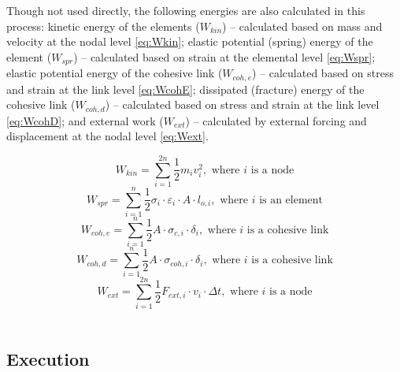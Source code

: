 \documentclass[12pt,a4paper]{article}
\begin{document}
Though not used directly, the following energies are also calculated in this process: kinetic energy of the elements ($W_{kin}$) -- calculated based on mass and velocity at the nodal level \eqref{eq:Wkin}; elastic potential (spring) energy of the element ($W_{spr}$) -- calculated based on strain at the elemental level \eqref{eq:Wspr}; elastic potential energy of the cohesive link ($W_{coh, e}$) -- calculated based on stress and strain at the link level \eqref{eq:WcohE}; dissipated (fracture) energy of the cohesive link ($W_{coh, d}$) -- calculated based on stress and strain at the link level \eqref{eq:WcohD}; and external work ($W_{ext}$) -- calculated by external forcing and displacement at the nodal level \eqref{eq:Wext}.

\begin{equation}
W_{kin} = \sum_{i=1}^{2n} \frac{1}{2} m_{i} v_{i}^{2},  \mbox{ where $i$ is a node}
\label{eq:Wkin}
\end{equation}
\begin{equation}
W_{spr} = \sum_{i=1}^{n} \frac{1}{2} \sigma_{i} \cdot \varepsilon_{i} \cdot A \cdot l_{o, i},  \mbox{ where $i$ is an element}
\label{eq:Wspr}
\end{equation}
\begin{equation}
W_{coh, e} = \sum_{i=1}^{n} \frac{1}{2} A \cdot \sigma_{c, i} \cdot \delta_{i},  \mbox{ where $i$ is a cohesive link}
\label{eq:WcohE}
\end{equation}
\begin{equation}
W_{coh, d} = \sum_{i=1}^{n} \frac{1}{2} A \cdot \sigma_{coh, i} \cdot \delta_{i},  \mbox{ where $i$ is a cohesive link}
\label{eq:WcohD}
\end{equation}
\begin{equation}
W_{ext} = \sum_{i=1}^{2n} \frac{1}{2} F_{ext, i} \cdot v_{i} \cdot \Delta t,  \mbox{ where $i$ is a node}
\label{eq:Wext}
\end{equation}\\

\subsection{Execution}
\end{document}
